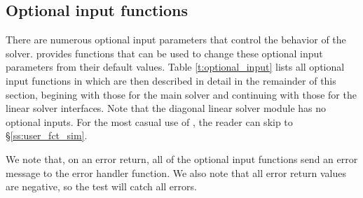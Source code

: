 \subsection{Optional input functions}\label{ss:optional_input}

There are numerous optional input parameters that control the behavior
of the {\cvode} solver.  {\cvode} provides functions that can be used to change
these optional input parameters from their default values.
Table \ref{t:optional_input} lists all optional input functions in {\cvode} which
are then described in detail in the remainder of this section, begining with those
for the main {\cvode} solver and continuing with those for the linear
solver interfaces.  Note that the diagonal linear solver module has no
optional inputs.  For the most casual use of {\cvode}, the reader
can skip to \S\ref{ss:user_fct_sim}.

We note that, on an error return, all of the optional input functions send an
error message to the error handler function. 
We also note that all error return values are negative, so the test 
will catch all errors.

